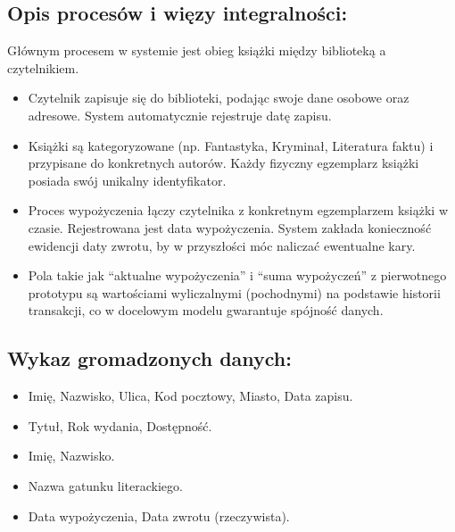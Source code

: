 \documentclass[letterpaper,10pt,english]{sphinxmanual}
\begin{document}
\subsection{Opis procesów i więzy integralności:}
\label{\detokenize{rozdzial_3/index:opis-procesow-i-wiezy-integralnosci}}
\sphinxAtStartPar
Głównym procesem w systemie jest obieg książki między biblioteką a czytelnikiem.
\begin{itemize}
\item {} 
\sphinxAtStartPar
{} Czytelnik zapisuje się do biblioteki, podając swoje dane osobowe oraz adresowe. System automatycznie rejestruje datę zapisu.

\item {} 
\sphinxAtStartPar
{} Książki są kategoryzowane (np. Fantastyka, Kryminał, Literatura faktu) i przypisane do konkretnych autorów. Każdy fizyczny egzemplarz książki posiada swój unikalny identyfikator.

\item {} 
\sphinxAtStartPar
{} Proces wypożyczenia łączy czytelnika z konkretnym egzemplarzem książki w czasie. Rejestrowana jest data wypożyczenia. System zakłada konieczność ewidencji daty zwrotu, by w przyszłości móc naliczać ewentualne kary.

\item {} 
\sphinxAtStartPar
{} Pola takie jak “aktualne wypożyczenia” i “suma wypożyczeń” z pierwotnego prototypu są wartościami wyliczalnymi (pochodnymi) na podstawie historii transakcji, co w docelowym modelu gwarantuje spójność danych.

\end{itemize}


\subsection{Wykaz gromadzonych danych:}
\label{\detokenize{rozdzial_3/index:wykaz-gromadzonych-danych}}\begin{itemize}
\item {} 
\sphinxAtStartPar
{} Imię, Nazwisko, Ulica, Kod pocztowy, Miasto, Data zapisu.

\item {} 
\sphinxAtStartPar
{} Tytuł, Rok wydania, Dostępność.

\item {} 
\sphinxAtStartPar
{} Imię, Nazwisko.

\item {} 
\sphinxAtStartPar
{} Nazwa gatunku literackiego.

\item {} 
\sphinxAtStartPar
{} Data wypożyczenia, Data zwrotu (rzeczywista).

\end{itemize}
\end{document}
